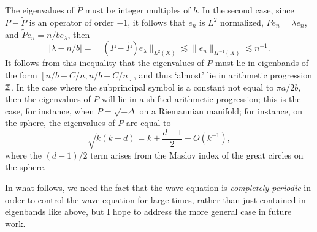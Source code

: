 The eigenvalues of $\tilde{P}$ must be integer multiples of $b$. In the second case, since $P - \tilde{P}$ is an operator of order $-1$, it follows that $e_n$ is $L^2$ normalized, $P e_n = \lambda e_n$, and $\tilde{P} e_n = n / b e_\lambda$, then
%
\[ |\lambda - n / b| = \| (P - \tilde{P}) e_\lambda \|_{L^2(X)} \lesssim \| e_n \|_{H^{-1}(X)} \lesssim n^{-1}. \]
%
It follows from this inequality that the eigenvalues of $P$ must lie in eigenbands of the form $[n/b - C/n, n/b + C/n]$, and thus `almost' lie in arithmetic progression $\operatorname{\mathbb{Z}}$. In the case where the subprincipal symbol is a constant not equal to $\pi a / 2b$, then the eigenvalues of $P$ will lie in a shifted arithmetic progression; this is the case, for instance, when $P = \sqrt{-\Delta}$ on a Riemannian manifold; for instance, on the sphere, the eigenvalues of $P$ are equal to
%
\begin{equation}
  \sqrt{k(k+d)} = k + \frac{d-1}{2} + O(k^{-1}),
\end{equation}
%
where the $(d-1)/2$ term arises from the Maslov index of the great circles on the sphere.

In what follows, we need the fact that the wave equation is \emph{completely periodic} in order to control the wave equation for large times, rather than just contained in eigenbands like above, but I hope to address the more general case in future work.